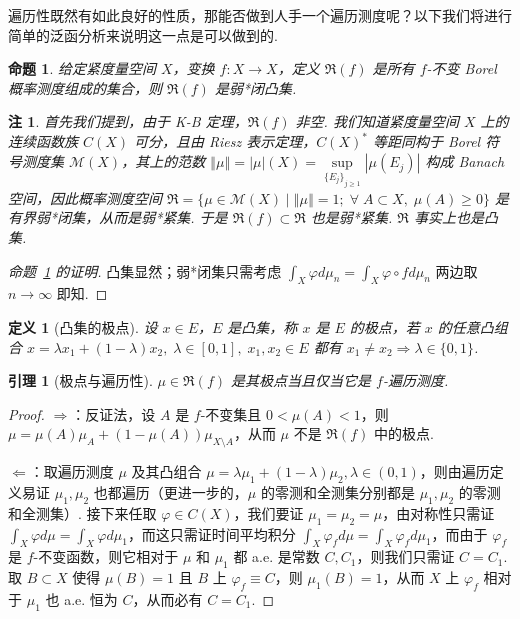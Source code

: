 \documentclass[11pt, a4paper, oneside]{ctexart}
\newtheorem{definition}[theorem]{定义}
\newtheorem{lemma}[theorem]{引理}
\newtheorem{proposition}[theorem]{命题}
\newtheorem{remark}[theorem]{注}
\newcommand{\cM}{\mathcal{M}}
\newcommand{\fR}{\mathfrak{R}}
\newcommand{\abs}[1]{\left|{#1}\right|}
\newcommand{\norm}[1]{\left\Vert{#1}\right\Vert}
\begin{document}
    遍历性既然有如此良好的性质，那能否做到人手一个遍历测度呢？以下我们将进行简单的泛函分析来说明这一点是可以做到的.

    \begin{proposition}\label{命题2.11}
        给定紧度量空间 $X$，变换 $f:X\to X$，定义 $\fR(f)$ 是所有 $f$-不变 Borel 概率测度组成的集合，则 $\fR(f)$ 是弱*闭凸集.
    \end{proposition}
    \begin{remark}
        首先我们提到，由于 K-B 定理，$\fR(f)$ 非空. 我们知道紧度量空间 $X$ 上的连续函数族 $C(X)$ 可分，且由 Riesz 表示定理，${C(X)}^*$ 等距同构于 Borel 符号测度集 $\cM(X)$，其上的范数 $\norm{\mu}=\abs{\mu}(X)=\sup\limits_{{\{E_j\}}_{j\geq 1}}\abs{\mu(E_j)}$ 构成 Banach 空间，因此概率测度空间 $\fR=\{\mu\in \cM(X)\mid \norm{\mu}=1;\; \forall\; A\subset X,\; \mu(A)\geq 0\}$ 是有界弱*闭集，从而是弱*紧集. 于是 $\fR(f)\subset \fR$ 也是弱*紧集. $\fR$ 事实上也是凸集.
    \end{remark}
    \begin{proof}[命题~\ref{命题2.11} 的证明]
        凸集显然；弱*闭集只需考虑 $\int_{X}\varphi d\mu_n=\int_{X}\varphi\circ f d\mu_n$ 两边取 $n\to\infty$ 即知.
    \end{proof}

    \begin{definition}[凸集的极点]
        设 $x\in E$，$E$ 是凸集，称 $x$ 是 $E$ 的极点，若 $x$ 的任意凸组合 $x=\lambda x_1+(1-\lambda)x_2,\;\lambda\in [0,1],\; x_1,x_2\in E$ 都有 $x_1\neq x_2\Rightarrow \lambda\in\{0,1\}$.
    \end{definition}

    \begin{lemma}[极点与遍历性]
        $\mu\in\fR(f)$ 是其极点当且仅当它是 $f$-遍历测度.
    \end{lemma}
    \begin{proof}
        $\Rightarrow$：反证法，设 $A$ 是 $f$-不变集且 $0<\mu(A)<1$，则 $\mu=\mu(A)\mu_A+(1-\mu(A))\mu_{X\setminus A}$，从而 $\mu$ 不是 $\fR(f)$ 中的极点.

        $\Leftarrow$：取遍历测度 $\mu$ 及其凸组合 $\mu=\lambda \mu_1+(1-\lambda)\mu_2,\lambda\in (0,1)$，则由遍历定义易证 $\mu_1,\mu_2$ 也都遍历（更进一步的，$\mu$ 的零测和全测集分别都是 $\mu_1,\mu_2$ 的零测和全测集）. 接下来任取 $\varphi\in C(X)$，我们要证 $\mu_1=\mu_2=\mu$，由对称性只需证 $\int_{X}\varphi d\mu=\int_{X}\varphi d\mu_1$，而这只需证时间平均积分 $\int_{X}\varphi_f d\mu=\int_{X}\varphi_f d\mu_1$，而由于 $\varphi_f$ 是 $f$-不变函数，则它相对于 $\mu$ 和 $\mu_1$ 都 a.e. 是常数 $C,C_1$，则我们只需证 $C=C_1$. 取 $B\subset X$ 使得 $\mu(B)=1$ 且 $B$ 上 $\varphi_f\equiv C$，则 $\mu_1(B)=1$，从而 $X$ 上 $\varphi_f$ 相对于 $\mu_1$ 也 a.e. 恒为 $C$，从而必有 $C=C_1$.
    \end{proof}
\end{document}
